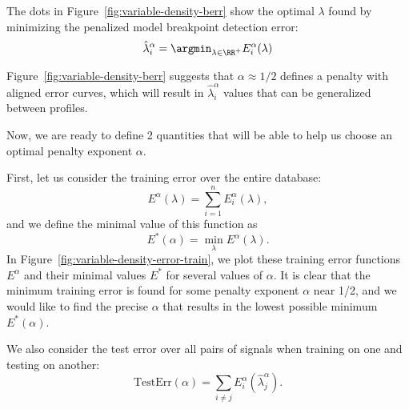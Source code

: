 \documentclass{article}
\begin{document}
The dots in Figure~\ref{fig:variable-density-berr} show the optimal
$\lambda$ found by minimizing the penalized model breakpoint detection
error:
\begin{equation}
  \label{eq:lambda_hat}
  \hat \lambda^\alpha_i = \argmin_{\lambda\in\RR^+}  E^\alpha_i(\lambda)
\end{equation}

Figure~\ref{fig:variable-density-berr} suggests that $\alpha\approx1/2$
defines a penalty with aligned error curves, which will result in
$\hat \lambda_i^\alpha$ values that can be generalized between
profiles. 


\newpage

Now, we are ready to define 2 quantities that will be able to help us
choose an optimal penalty exponent $\alpha$.

First, let us consider the training error over the entire database:
\begin{equation}
  \label{eq:lerr_train}
  E^\alpha(\lambda) = \sum_{i=1}^n E_i^\alpha(\lambda),
\end{equation}
and we define the minimal value of this function as
\begin{equation}
  \label{eq:lerr_train_min}
  E^*(\alpha) = \min_\lambda E^\alpha(\lambda).
\end{equation}
In Figure~\ref{fig:variable-density-error-train}, we plot these
training error functions $E^\alpha$ and their minimal values $E^*$ for
several values of $\alpha$. It is clear that the minimum training
error is found for some penalty exponent $\alpha$ near 1/2, and we
would like to find the precise $\alpha$ that results in the lowest
possible minimum $E^*(\alpha)$.


\newpage

We also consider the test error over all pairs of signals when
training on one and testing on another:
\begin{equation}
  \label{eq:lerr_test}
  \text{TestErr}(\alpha) = 
\sum_{i\neq j} E^\alpha_i(\hat \lambda_j^\alpha).
\end{equation}
\end{document}
